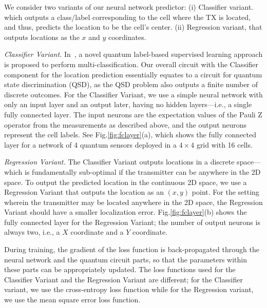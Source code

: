 
We consider two variants of our neural network predictor: (i) Classifier variant. which outputs a class/label corresponding to the cell where the TX is located, and thus, predicts the location to be the cell's center. (ii) 
Regression variant, that outputs locations as the $x$ and $y$ coordinates.

{\em Classifier Variant.}
In~\cite{jindi2023}, a novel quantum label-based supervised learning approach is proposed to perform multi-classification.
Our overall circuit with the Classifier component for the location prediction essentially equates to a circuit for quantum state discrimination (QSD), as the 
QSD problem also outputs a finite number of discrete outcomes.
For the Classifier Variant, we use a simple neural network with only an input layer and an output later, having no hidden layers---i.e., a single 
fully connected layer.
The input neurons are the expectation values of the Pauli Z operator from the measurements as described above, and the output neurons represent the cell labels. See Fig.\ref{fig:fclayer}(a), which shows the fully connected layer for a network of 4 quantum sensors deployed in a $4\times 4$ grid with 16 cells.

{\em Regression Variant.}
The Classifier Variant outputs locations in a discrete space---which is fundamentally sub-optimal if the transmitter can be anywhere in the 2D space. 
To output the predicted location in the continuous 2D space, we use a Regression Variant that outputs the location as an $(x,y)$ point.
For the setting wherein the transmitter may be located anywhere in the 
2D space, the Regression Variant should have a smaller localization error.
Fig.\ref{fig:fclayer}(b) shows the fully connected layer for the Regression Variant; the number of output neurons is always two, i.e., a $X$ coordinate and a $Y$ coordinate.

During training, the gradient of the loss function is back-propagated through the neural network and the quantum circuit parts, so that the parameters within these parts can be appropriately updated. 
The loss functions used for the Classifier Variant and the Regression Variant are different; for the Classifier variant, we use the cross-entropy loss function while for the Regression variant, we use the mean square error loss function.

